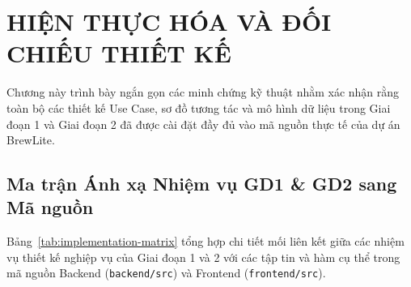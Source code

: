 \documentclass[12pt,a4paper,oneside]{report}
\begin{document}


\chapter{HIỆN THỰC HÓA VÀ ĐỐI CHIẾU THIẾT KẾ}

Chương này trình bày ngắn gọn các minh chứng kỹ thuật nhằm xác nhận rằng toàn bộ các thiết kế Use Case, sơ đồ tương tác và mô hình dữ liệu trong Giai đoạn 1 và Giai đoạn 2 đã được cài đặt đầy đủ vào mã nguồn thực tế của dự án BrewLite.

\section{Ma trận Ánh xạ Nhiệm vụ GD1 \& GD2 sang Mã nguồn}
Bảng~\ref{tab:implementation-matrix} tổng hợp chi tiết mối liên kết giữa các nhiệm vụ thiết kế nghiệp vụ của Giai đoạn 1 và 2 với các tập tin và hàm cụ thể trong mã nguồn Backend (\texttt{backend/src}) và Frontend (\texttt{frontend/src}).
\end{document}

